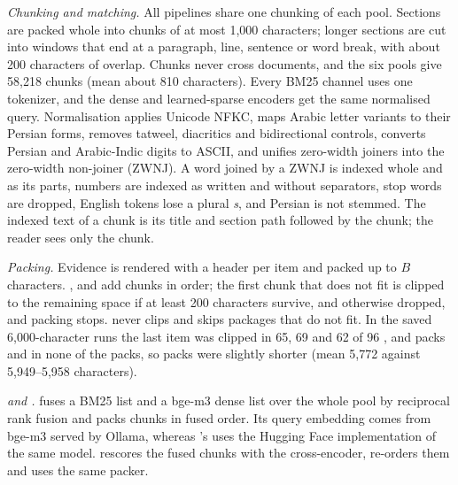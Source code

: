 

\emph{Chunking and matching.} All pipelines share one chunking of each pool. Sections are packed whole into chunks of at most 1,000 characters; longer sections are cut into windows that end at a paragraph, line, sentence or word break, with about 200 characters of overlap. Chunks never cross documents, and the six pools give 58,218 chunks (mean about 810 characters). Every BM25 channel uses one tokenizer, and the dense and learned-sparse encoders get the same normalised query. Normalisation applies Unicode NFKC, maps Arabic letter variants to their Persian forms, removes tatweel, diacritics and bidirectional controls, converts Persian and Arabic-Indic digits to ASCII, and unifies zero-width joiners into the zero-width non-joiner (ZWNJ). A word joined by a ZWNJ is indexed whole and as its parts, numbers are indexed as written and without separators, stop words are dropped, English tokens lose a plural \emph{s}, and Persian is not stemmed. The indexed text of a chunk is its title and section path followed by the chunk; the reader sees only the chunk.

\emph{Packing.} Evidence is rendered with a header per item and packed up to $B$ characters. \hybrid, \hr{} and \setr{} add chunks in order; the first chunk that does not fit is clipped to the remaining space if at least 200 characters survive, and otherwise dropped, and packing stops. \lexb{} never clips and skips packages that do not fit. In the saved 6,000-character runs the last item was clipped in 65, 69 and 62 of 96 \hybrid, \hr{} and \setr{} packs and in none of the \lexb{} packs, so \lexb{} packs were slightly shorter (mean 5,772 against 5,949--5,958 characters).

\emph{\hybrid{} and \hr.} \hybrid{} fuses a BM25 list and a bge-m3 dense list over the whole pool by reciprocal rank fusion and packs chunks in fused order. Its query embedding comes from bge-m3 served by Ollama, whereas \lexb's \ftwo{} uses the Hugging Face implementation of the same model. \hr{} rescores the fused chunks with the cross-encoder, re-orders them and uses the same packer.

